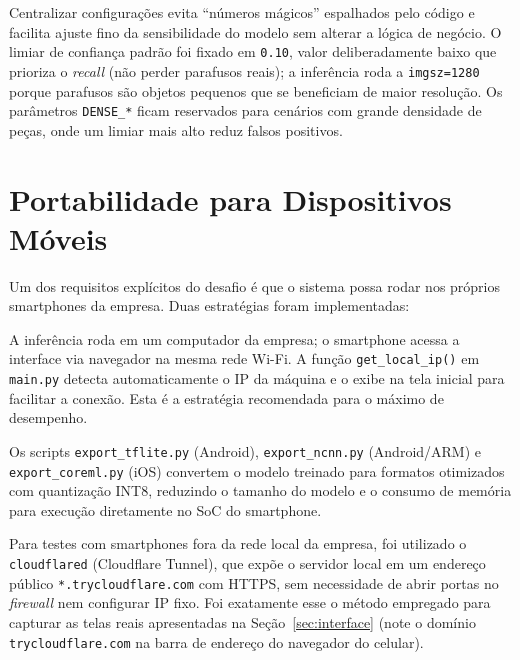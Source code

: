 \documentclass[12pt,a4paper]{article}
\begin{document}
Centralizar configura\c{c}\~oes evita ``n\'umeros m\'agicos'' espalhados pelo c\'odigo e
facilita ajuste fino da sensibilidade do modelo sem alterar a l\'ogica de neg\'ocio.
O limiar de confian\c{c}a padr\~ao foi fixado em \texttt{0.10}, valor deliberadamente
baixo que prioriza o \emph{recall} (n\~ao perder parafusos reais); a infer\^encia roda a
\texttt{imgsz=1280} porque parafusos s\~ao objetos pequenos que se beneficiam de maior
resolu\c{c}\~ao. Os par\^ametros \texttt{DENSE\_*} ficam reservados para cen\'arios com
grande densidade de pe\c{c}as, onde um limiar mais alto reduz falsos positivos.

\section{Portabilidade para Dispositivos M\'oveis}

Um dos requisitos expl\'icitos do desafio \'e que o sistema possa rodar nos pr\'oprios
smartphones da empresa. Duas estrat\'egias foram implementadas:

\begin{description}[leftmargin=*,style=nextline]
  \item[Estrat\'egia 1 -- Servidor + cliente web:] A infer\^encia roda em um computador
    da empresa; o smartphone acessa a interface via navegador na mesma rede Wi-Fi. A
    fun\c{c}\~ao \texttt{get\_local\_ip()} em \texttt{main.py} detecta automaticamente o
    IP da m\'aquina e o exibe na tela inicial para facilitar a conex\~ao. Esta \'e a
    estrat\'egia recomendada para o m\'aximo de desempenho.

  \item[Estrat\'egia 2 -- Modelo embarcado no dispositivo:] Os scripts
    \texttt{export\_tflite.py} (Android), \texttt{export\_ncnn.py} (Android/ARM) e
    \texttt{export\_coreml.py} (iOS) convertem o modelo treinado para formatos otimizados
    com quantiza\c{c}\~ao INT8, reduzindo o tamanho do modelo e o consumo de mem\'oria
    para execu\c{c}\~ao diretamente no SoC do smartphone.

  \item[Estrat\'egia 3 -- T\'unel HTTPS via Cloudflare:] Para testes com smartphones fora
    da rede local da empresa, foi utilizado o \texttt{cloudflared} (Cloudflare Tunnel),
    que exp\~oe o servidor local em um endere\c{c}o p\'ublico \texttt{*.trycloudflare.com}
    com HTTPS, sem necessidade de abrir portas no \emph{firewall} nem configurar IP fixo.
    Foi exatamente esse o m\'etodo empregado para capturar as telas reais apresentadas na
    Se\c{c}\~ao~\ref{sec:interface} (note o dom\'inio \texttt{trycloudflare.com} na barra
    de endere\c{c}o do navegador do celular).
\end{description}
\end{document}
